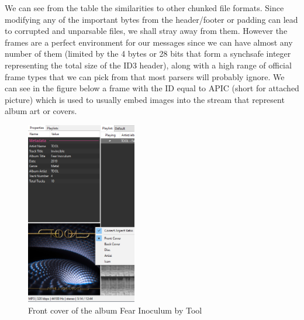 \begin{multicols*}{2}
We can see from the table the similarities to other chunked file formats. Since modifying any of the important bytes from the header/footer or padding can lead to corrupted and unparsable files, we shall stray away from them. However the frames are a perfect environment for our messages since we can have almost any number of them (limited by the 4 bytes or 28 bits that form a synchsafe integer representing the total size of the ID3 header), along with a high range of official frame types that we can pick from that most parsers will probably ignore. We can see in the figure below a frame with the ID equal to APIC (short for attached picture) which is used to usually embed images into the stream that represent album art or covers.
\begin{figure}[H]
    \centering
    \includegraphics[height=8cm,keepaspectratio]{pics/audio_chapter/tool_cover_example.png}
    \caption{Front cover of the album Fear Inoculum by Tool}
\end{figure}


\end{multicols*}

